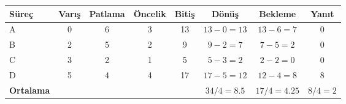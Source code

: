 \begin{tabular}{@{}lccccccc@{}}
\toprule
\textbf{Süreç} & \textbf{Varış} & \textbf{Patlama} & \textbf{Öncelik} & \textbf{Bitiş} & \textbf{Dönüş} & \textbf{Bekleme} & \textbf{Yanıt}\\
\midrule
A & 0 & 6 & 3 & 13 & $13-0=13$ & $13-6=7$ & 0\\
B & 2 & 5 & 2 & 9 & $9-2=7$ & $7-5=2$ & 0\\
C & 3 & 2 & 1 & 5 & $5-3=2$ & $2-2=0$ & 0\\
D & 5 & 4 & 4 & 17 & $17-5=12$ & $12-4=8$ & 8\\
\midrule
\textbf{Ortalama} &  &  &  &  & $34/4=8.5$ & $17/4=4.25$ & $8/4=2$\\
\bottomrule
\end{tabular}
